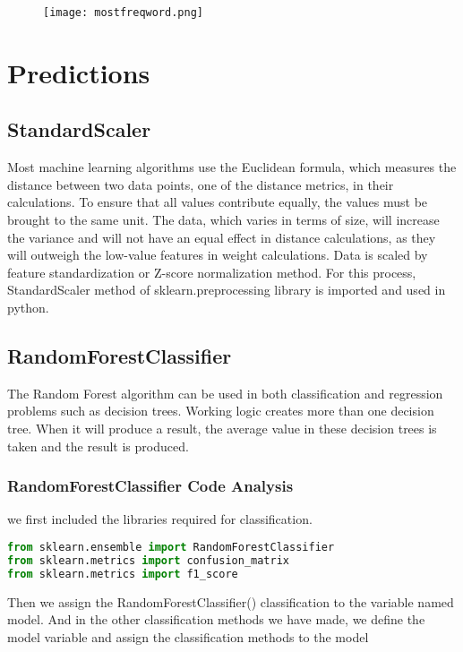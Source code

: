\documentclass[onecolumn]{article}
\begin{document}
\begin{figure}[ht!]
\centering
\texttt{[image: mostfreqword.png]}
\caption{ \label{}}
\end{figure}


\section{Predictions}


\subsection{StandardScaler}
Most machine learning algorithms use the Euclidean formula, which measures the distance between two data points, one of the distance metrics, in their calculations. To ensure that all values contribute equally, the values must be brought to the same unit. The data, which varies in terms of size, will increase the variance and will not have an equal effect in distance calculations, as they will outweigh the low-value features in weight calculations. Data is scaled by feature standardization or Z-score normalization method. For this process, StandardScaler method of sklearn.preprocessing library is imported and used in python.

\subsection{RandomForestClassifier}


The Random Forest algorithm can be used in both classification and regression problems such as decision trees. Working logic creates more than one decision tree. When it will produce a result, the average value in these decision trees is taken and the result is produced.

\subsubsection{RandomForestClassifier Code Analysis}

we first included the libraries required for classification.

\begin{lstlisting}[language=Python, caption= RandomForestClassifier]
from sklearn.ensemble import RandomForestClassifier
from sklearn.metrics import confusion_matrix
from sklearn.metrics import f1_score
\end{lstlisting}

Then we assign the RandomForestClassifier() classification to the variable named model. And in the other classification methods we have made, we define the model variable and assign the classification methods to the model
\end{document}

